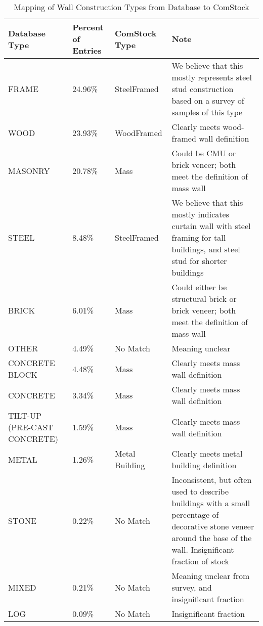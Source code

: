 \begin{table}
\small
\centering
\caption[Mapping of Wall Construction Types from Database to ComStock]{Mapping of Wall Construction Types from Database to ComStock}
\label{tab:wall_construction_mapping}
\begin{tabular}{|p{1.25in}|l|l|p{2in}|}
\hline
\textbf{Database Type}& \textbf{Percent of Entries} & \textbf{ComStock Type} & \textbf{Note} \\ \hline
FRAME                         & 24.96\%  & SteelFramed & We believe that this mostly represents steel stud construction based on a survey of samples of this type \\ \hline
WOOD                          & 23.93\%  & WoodFramed  & Clearly meets wood-framed wall definition \\ \hline
MASONRY                       & 20.78\%  & Mass        & Could be CMU or brick veneer; both meet the definition of mass wall \\ \hline
STEEL                         & 8.48\%   & SteelFramed & We believe that this mostly indicates curtain wall with steel framing for tall buildings, and steel stud for shorter buildings \\ \hline
BRICK                         & 6.01\%   & Mass        & Could either be structural brick or brick veneer; both meet the definition of mass wall \\ \hline
OTHER                         & 4.49\%   & No Match    & Meaning unclear \\ \hline
CONCRETE BLOCK                & 4.48\%   & Mass        & Clearly meets mass wall definition \\ \hline
CONCRETE                      & 3.34\%   & Mass        & Clearly meets mass wall definition \\ \hline
TILT-UP (PRE-CAST CONCRETE)   & 1.59\%   & Mass        & Clearly meets mass wall definition \\ \hline
METAL                         & 1.26\%   & Metal Building  & Clearly meets metal building definition \\ \hline
STONE                         & 0.22\%   & No Match    & Inconsistent, but often used to describe buildings with a small percentage of decorative stone veneer around the base of the wall. Insignificant fraction of stock \\ \hline
MIXED                         & 0.21\%   & No Match    & Meaning unclear from survey, and insignificant fraction \\ \hline
LOG                           & 0.09\%   & No Match    & Insignificant fraction \\ \hline

\end{tabular}
\end{table}
